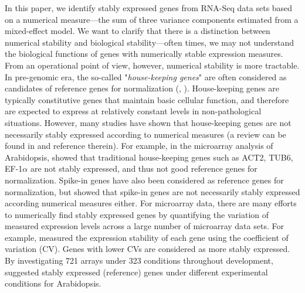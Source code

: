 \documentclass[11pt, a4paper]{article}
\begin{document}
In this paper, we identify stably expressed genes from RNA-Seq data sets based
on a numerical measure---the sum of three variance components estimated from a
mixed-effect model.  We want to clarify that there is a distinction between
numerical stability and biological stability---often times, we may not
understand the biological functions of genes with numerically stable
expression measures.  From an operational point of view, however, numerical
stability is more tractable. In pre-genomic era, the so-called "\textit{house-keeping
genes}" are often considered as candidates of reference genes for
normalization (\cite{bustin2002quantification},
\cite{andersen2004normalization}). House-keeping
genes are typically constitutive genes that
maintain basic cellular function, and therefore are expected to express at
relatively constant levels in non-pathological situations.  However, many
studies have shown that house-keeping
genes are not necessarily stably expressed according to
numerical measures (a review can be found in \cite{huggett2005real} and
reference therein).  For example, in the microarray analysis of Arabidopsis, \cite{czechowski2005genome}
showed that traditional house-keeping
genes such as ACT2, TUB6, EF-1$\alpha$ are not stably
expressed, and thus not good reference genes for normalization.  Spike-in
genes have also been considered as reference genes for normalization, but
\cite{risso2014nat} showed that spike-in genes are not necessarily stably
expressed according numerical measures either.  
For microarray data, there are many efforts to numerically find stably
expressed genes by quantifying the variation of measured expression levels
across a large number of microarray data sets.  For example,
\cite{czechowski2005genome} measured the expression stability of each gene
using the coefficient of variation (CV). Genes with lower CVs are considered
as more stably expressed.  By investigating 721 arrays under 323 conditions
throughout development, \cite{czechowski2005genome} suggested stably expressed
(reference) genes under different experimental conditions for Arabidopsis.
\end{document}
